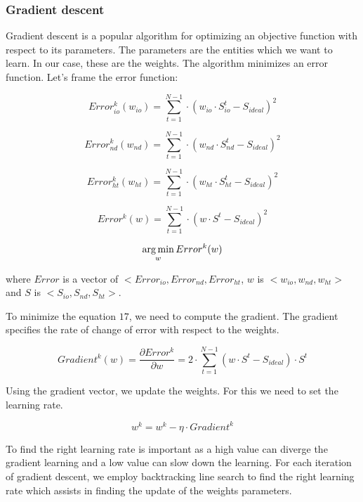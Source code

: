 \subsubsection{Gradient descent}
Gradient descent is a popular algorithm for optimizing an objective function with respect to its parameters. The parameters are the entities which we want to learn. In our case, these are the weights. The algorithm minimizes an error function. Let's frame the error function:

\begin{equation}
Error^k_{io}(w_{io}) = \sum_{t=1}^{N-1} \cdot (w_{io} \cdot S^t_{io} - S_{ideal}) ^ 2
\end{equation}

\begin{equation}
Error^k_{nd}(w_{nd}) = \sum_{t=1}^{N-1} \cdot (w_{nd} \cdot S^t_{nd} - S_{ideal}) ^ 2
\end{equation}

\begin{equation}
Error^k_{ht}(w_{ht}) = \sum_{t=1}^{N-1} \cdot (w_{ht} \cdot S^t_{ht} - S_{ideal}) ^ 2
\end{equation}

\begin{equation}
Error^k(w) = \sum_{t=1}^{N-1} \cdot (w \cdot S^t - S_{ideal}) ^ 2
\end{equation}

\begin{equation}
\operatorname*{arg\,min}_w Error^k(w) 
\end{equation} 

where $Error$ is a vector of $<Error_{io}, Error_{nd}, Error_{ht}$,
$w$ is $<w_{io}, w_{nd}, w_{ht}>$ and $S$ is $<S_{io}, S_{nd}, S_{ht}>$.

To minimize the equation $17$, we need to compute the gradient. The gradient specifies the rate of change of error with respect to the weights.

\begin{equation}
Gradient^k(w) = \frac{\partial Error^k}{\partial w} = 2 \cdot \sum_{t=1}^{N-1} (w \cdot S^t - S_{ideal}) \cdot S^t
\end{equation}

Using the gradient vector, we update the weights. For this we need to set the learning rate.

\begin{equation}
w^k = w^k - \eta \cdot {Gradient^k}
\end{equation}

To find the right learning rate is important as a high value can diverge the gradient learning and a low value can slow down the learning. For each iteration of gradient descent, we employ backtracking line search to find the right learning rate which assists in finding the update of the weights parameters.

